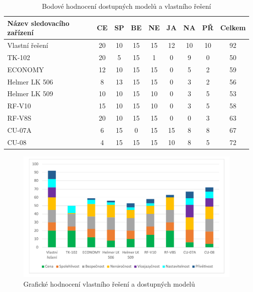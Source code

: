 \documentclass[FM,MP]{tulthesis}  %
\begin{document}
\renewcommand{\arraystretch}{1.5}
\begin{table}[H]
\begin{center}
\begin{tabular}{| l | c | c| c | c | c | c | c | c |}
\hline
Název sledovacího zařízení & CE & SP & BE & NE & JA & NA & PŘ & Celkem\\
\hline
\hline
Vlastní řešení & 20 & 10 & 15 & 15 & 12 & 10 & 10 & 92\\
\hline
TK-102 & 20 & 5 & 15 & 1 & 0 & 9 & 0 & 50\\
\hline
ECONOMY & 12 & 10 & 15 & 15 & 0 & 5 & 2 & 59\\
\hline
Helmer LK 506 & 8 & 13 & 15 & 15 & 0 & 3 & 2 & 56\\
\hline
Helmer LK 509 & 10 & 10 & 15 & 10 & 0 & 3 & 5 & 53\\
\hline
RF-V10 & 15 & 10 & 15 & 10 & 0 & 3 & 5 & 58\\
\hline
RF-V8S & 20 & 10 & 15 & 15 & 0 & 0 & 3 & 63\\
\hline
CU-07A & 6 & 15 & 0 & 15 & 15 & 8 & 8 & 67\\
\hline
CU-08 & 4 & 15 & 15 & 15 & 10 & 8 & 5 & 72\\
\hline
\end{tabular}
\end{center}
\caption{Bodové hodnocení dostupných modelů a vlastního řešení}
\end{table}

\begin{figure}[H]
\begin{center}
\includegraphics[width=\textwidth]{graphs/graf_bodoveHodnoceni_final.pdf}
\caption{Grafické hodnocení vlastního řešení a dostupných modelů}
\label{image}
\end{center}
\end{figure}
\end{document}
